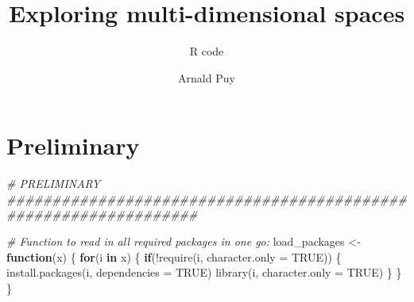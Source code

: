 \documentclass[
  11pt,
]{article}
\title{Exploring multi-dimensional spaces}
\subtitle{R code}
\author{Arnald Puy}
\date{}
\newenvironment{Shaded}{\begin{snugshade}}{\end{snugshade}}
\newcommand{\AttributeTok}[1]{\textcolor[rgb]{0.77,0.63,0.00}{#1}}
\newcommand{\CommentTok}[1]{\textcolor[rgb]{0.56,0.35,0.01}{\textit{#1}}}
\newcommand{\ConstantTok}[1]{\textcolor[rgb]{0.00,0.00,0.00}{#1}}
\newcommand{\ControlFlowTok}[1]{\textcolor[rgb]{0.13,0.29,0.53}{\textbf{#1}}}
\newcommand{\FunctionTok}[1]{\textcolor[rgb]{0.00,0.00,0.00}{#1}}
\newcommand{\NormalTok}[1]{#1}
\newcommand{\OtherTok}[1]{\textcolor[rgb]{0.56,0.35,0.01}{#1}}
\newcommand{\SpecialCharTok}[1]{\textcolor[rgb]{0.00,0.00,0.00}{#1}}
\begin{document}
\maketitle

{
\setcounter{tocdepth}{2}
\tableofcontents
}
\newpage

\hypertarget{preliminary}{%
\section{Preliminary}\label{preliminary}}

\begin{Shaded}
\begin{Highlighting}[]
\CommentTok{\# PRELIMINARY \#\#\#\#\#\#\#\#\#\#\#\#\#\#\#\#\#\#\#\#\#\#\#\#\#\#\#\#\#\#\#\#\#\#\#\#\#\#\#\#\#\#\#\#\#\#\#\#\#\#\#\#\#\#\#\#\#\#\#\#\#\#\#\#\#}

\CommentTok{\# Function to read in all required packages in one go:}
\NormalTok{load\_packages }\OtherTok{\textless{}{-}} \ControlFlowTok{function}\NormalTok{(x) \{}
  \ControlFlowTok{for}\NormalTok{(i }\ControlFlowTok{in}\NormalTok{ x) \{}
    \ControlFlowTok{if}\NormalTok{(}\SpecialCharTok{!}\FunctionTok{require}\NormalTok{(i, }\AttributeTok{character.only =} \ConstantTok{TRUE}\NormalTok{)) \{}
      \FunctionTok{install.packages}\NormalTok{(i, }\AttributeTok{dependencies =} \ConstantTok{TRUE}\NormalTok{)}
      \FunctionTok{library}\NormalTok{(i, }\AttributeTok{character.only =} \ConstantTok{TRUE}\NormalTok{)}
\NormalTok{    \}}
\NormalTok{  \}}
\NormalTok{\}}


\end{Highlighting}
\end{Shaded}
\end{document}
